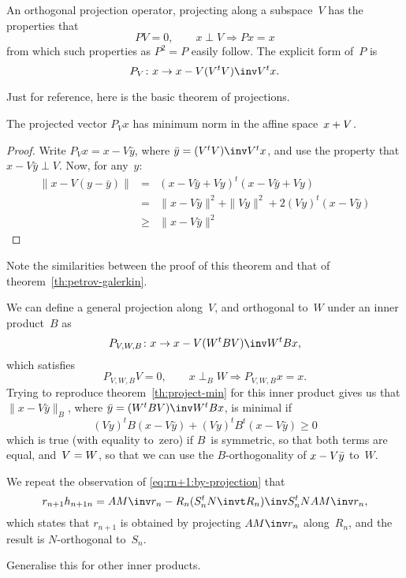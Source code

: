 An orthogonal projection operator, projecting along a subspace~$V$ has
the properties that
\[ PV=0,\qquad x\perp V\Rightarrow Px=x \]
from which such properties as $P^2=P$ easily follow. The explicit form
of~$P$ is 
\begin{equation}
    P_V\colon x\rightarrow x-V(V^tV)\inv V^tx.
    \label{eq:simple-projection}\end{equation}

Just for reference, here is the basic theorem of projections.
\begin{theorem}\label{th:project-min}
The projected vector $P_Vx$ has minimum norm in the affine
space~$x+\nobreak V$.
\end{theorem}
\begin{proof}
Write $P_Vx=x-V\bar y$, where $\bar y=\nobreak (V^tV)\inv V^tx$,
and use the property that $x-V\bar y\perp V$.
Now, for any~$y$:
\begin{eqnarray*}
\|x-V(y-\bar y)\| &=&(x-V\bar y+Vy)^t(x-V\bar y+Vy)\\
&=&\|x-V\bar y\|^2+\|Vy\|^2 +2(Vy)^t(x-V\bar y)\\
&\geq&\|x-V\bar y\|^2
\end{eqnarray*}
\end{proof}

Note the similarities between the proof of this theorem and
that of theorem~\ref{th:petrov-galerkin}.

We can define a general projection along~$V$, and orthogonal to~$W$
under an inner product~$B$ as
\begin{equation}
    P_{V,W,B}\colon x\rightarrow x-V(W^tBV)\inv W^tBx,
    \label{eq:general-projection}\end{equation}
which satisfies
\[ P_{V,W,B}V=0,\qquad x\perp_BW\Rightarrow P_{V,W,B}x=x.\]
Trying to reproduce theorem~\ref{th:project-min} for this inner
product gives us that $\|x-V\bar y\|_B$,
where $\bar y=\nobreak(W^tBV)\inv W^tBx$,
is minimal if
\[ (Vy)^tB(x-V\bar y)+(Vy)^tB^t(x-V\bar y)\geq 0 \]
which is true (with equality to~zero) if $B$~is symmetric,
so that both terms are equal,
and~$V=\nobreak W$, so that we can use the $B$-orthogonality of
$x-\nobreak V\bar y$ to~$W$.

We repeat the observation of \eqref{eq:rn+1:by-projection} that
\[r_{n+1}h_{n+1n}=AM\inv r_n-R_n(S_n^tN\invt R_n)\inv S_n^tN AM\inv r_n,\]
which states that $r_{n+1}$ is obtained by projecting $AM\inv r_n$
along~$R_n$, and the result is $N$-orthogonal to~$S_n$.

\begin{question}
Generalise this for other inner products.
\end{question}
